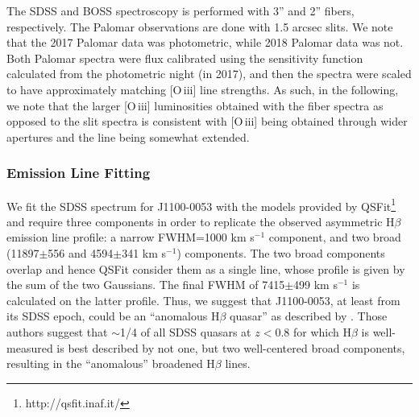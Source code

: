 \documentclass[a4paper,fleqn,usenatbib]{mnras}
\begin{document}
The SDSS and BOSS spectroscopy is performed with 3'' and 2'' fibers,
respectively. The Palomar observations are done with 1.5 arcsec
slits. We note that the 2017 Palomar data was photometric, while 2018
Palomar data was not.  Both Palomar spectra were flux calibrated using
the sensitivity function calculated from the photometric night (in
2017), and then the spectra were scaled to have approximately matching
[O\,{\sc iii}] line strengths. As such, in the following, we note that
the larger [O\,{\sc iii}] luminosities obtained with the fiber spectra
as opposed to the slit spectra is consistent with [O\,{\sc iii}] being
obtained through wider apertures and the line being somewhat extended.


\subsubsection{Emission Line Fitting} 
We fit the SDSS spectrum for J1100-0053 with the models provided by
QSFit\footnote{http://qsfit.inaf.it/}\citep{Calderone2017} and require
three components in order to replicate the observed asymmetric
H$\beta$ emission line profile: a narrow FWHM=1000 km s$^{-1}$
component, and two broad (11897$\pm$556 and 4594$\pm$341 km s$^{-1}$)
components. The two broad components overlap and hence QSFit consider
them as a single line, whose profile is given by the sum of the two
Gaussians. The final FWHM of 7415$\pm$499 km s$^{-1}$ is calculated on
the latter profile.  Thus, we suggest that J1100-0053, at least from
its SDSS epoch, could be an ``anomalous H$\beta$ quasar'' as described
by \citet{Steinhardt_Silverman2013}. Those authors suggest that
$\sim$1/4 of all SDSS quasars at $z < 0.8$ for which H$\beta$ is
well-measured is best described by not one, but two well-centered
broad components, resulting in the ``anomalous'' broadened H$\beta$
lines.
\end{document}
